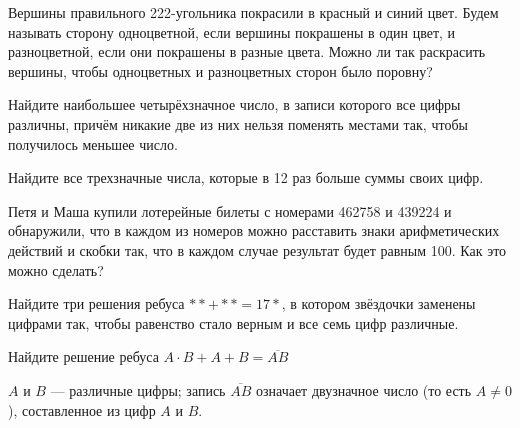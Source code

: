 \documentclass{article}
\begin{document}
\begin{enumerate_boxed}
        \item Вершины правильного 222-угольника покрасили в красный и синий цвет.
        Будем называть сторону одноцветной, если вершины покрашены в один цвет, и разноцветной, если они покрашены в разные цвета.
        Можно ли так раскрасить вершины, чтобы одноцветных и разноцветных сторон было поровну?

        \item Найдите наибольшее четырёхзначное число, в записи которого все цифры различны, причём никакие две из них нельзя поменять местами так, чтобы получилось меньшее число.

        \item Найдите все трехзначные числа, которые в 12 раз больше суммы своих цифр.

        \item Петя и Маша купили лотерейные билеты с номерами 462758 и 439224 и обнаружили, что в каждом из номеров можно расставить знаки арифметических действий и скобки так, что в каждом случае результат будет равным 100.
        Как это можно сделать?

        \item Найдите три решения ребуса $\ast\ast+\ast\ast = 17\ast$, в котором звёздочки заменены цифрами так, чтобы равенство стало верным и все семь цифр различные.

        \item Найдите решение ребуса
        $A \cdot B + A + B = \overline{AB}$

        $A$ и $B$ — различные цифры; запись $\overline{AB}$ означает двузначное число (то есть $A \neq 0$), составленное из цифр $A$ и $B$.
    \end{enumerate_boxed}
\end{document}
